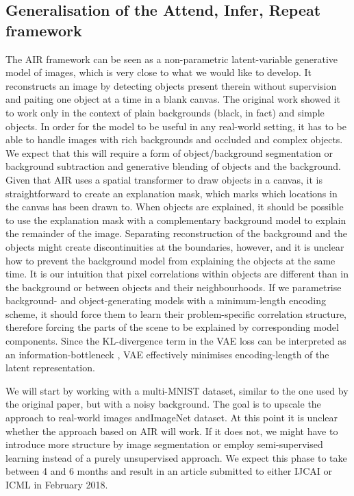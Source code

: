     \subsection{Generalisation of the Attend, Infer, Repeat framework}
        The AIR framework can be seen as a non-parametric latent-variable generative model of images, which is very close to what we would like to develop.
        It reconstructs an image by detecting objects present therein without supervision and paiting one object at a time in a blank canvas.
        The original work showed it to work only in the context of plain backgrounds (black, in fact) and simple objects.
        In order for the model to be useful in any real-world setting, it has to be able to handle images with rich backgrounds and occluded and complex objects. 
        We expect that this will require a form of object/background segmentation or background subtraction and generative blending of objects and the background.  
        Given that AIR uses a spatial transformer \citep{Jaderberg2015} to draw objects in a canvas, it is straightforward to create an explanation mask, which marks which locations in the canvas has been drawn to. 
        When objects are explained, it should be possible to use the explanation mask with a complementary background model to explain the remainder of the image.
        Separating reconstruction of the background and the objects might create discontinuities at the boundaries, however, and it is unclear how to prevent the background model from explaining the objects at the same time.
        It is our intuition that pixel correlations within objects are different than in the background or between objects and their neighbourhoods.
        If we parametrise background- and object-generating models with a minimum-length encoding scheme, it should force them to learn their problem-specific correlation structure, therefore forcing the parts of the scene to be explained by corresponding model components.
        Since the KL-divergence term in the VAE loss can be interpreted as an information-bottleneck \citep{Achille2016}, VAE effectively minimises encoding-length of the latent representation.
        
        We will start by working with a multi-MNIST dataset, similar to the one used by the original paper, but with a noisy background. 
        The goal is to upscale the approach to real-world images and\eg ImageNet dataset.
        At this point it is unclear whether the approach based on AIR will work. If it does not, we might have to introduce more structure by \eg image segmentation or employ semi-supervised learning instead of a purely unsupervised approach.
        We expect this phase to take between 4 and 6 months and result in an article submitted to either IJCAI or ICML in February 2018.
    
